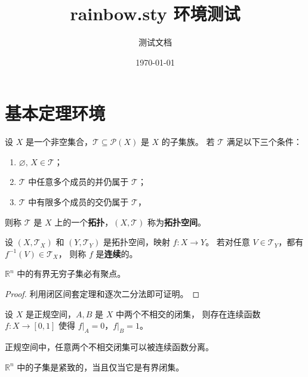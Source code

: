 \documentclass[12pt,a4paper]{ctexart}
\title{\textbf{rainbow.sty 环境测试}}
\author{测试文档}
\date{\today}
\begin{document}
\maketitle
\tableofcontents
\newpage

\section{基本定理环境}

\begin{definition}[拓扑空间]
设 $X$ 是一个非空集合，$\mathcal{T}\subseteq\mathcal{P}(X)$ 是 $X$ 的子集族。
若 $\mathcal{T}$ 满足以下三个条件：
\begin{enumerate}
  \item $\varnothing,\,X\in\mathcal{T}$；
  \item $\mathcal{T}$ 中任意多个成员的并仍属于 $\mathcal{T}$；
  \item $\mathcal{T}$ 中有限多个成员的交仍属于 $\mathcal{T}$，
\end{enumerate}
则称 $\mathcal{T}$ 是 $X$ 上的一个\textbf{拓扑}，$(X,\mathcal{T})$ 称为\textbf{拓扑空间}。
\end{definition}

\begin{definition}[连续映射]
设 $(X,\mathcal{T}_X)$ 和 $(Y,\mathcal{T}_Y)$ 是拓扑空间，映射 $f\colon X\to Y$。
若对任意 $V\in\mathcal{T}_Y$，都有 $f^{-1}(V)\in\mathcal{T}_X$，
则称 $f$ 是\textbf{连续}的。
\end{definition}

\begin{theorem}
$\mathbb{R}^n$ 中的有界无穷子集必有聚点。
\end{theorem}

\begin{proof}
利用闭区间套定理和逐次二分法即可证明。
\end{proof}

\begin{lemma}[Urysohn 引理]
设 $X$ 是正规空间，$A,B$ 是 $X$ 中两个不相交的闭集，
则存在连续函数 $f\colon X\to[0,1]$ 使得
$f|_A=0$，$f|_B=1$。
\end{lemma}

\begin{corollary}
正规空间中，任意两个不相交闭集可以被连续函数分离。
\end{corollary}

\begin{theorem}
$\mathbb{R}^n$ 中的子集是紧致的，当且仅当它是有界闭集。
\end{theorem}
\end{document}
